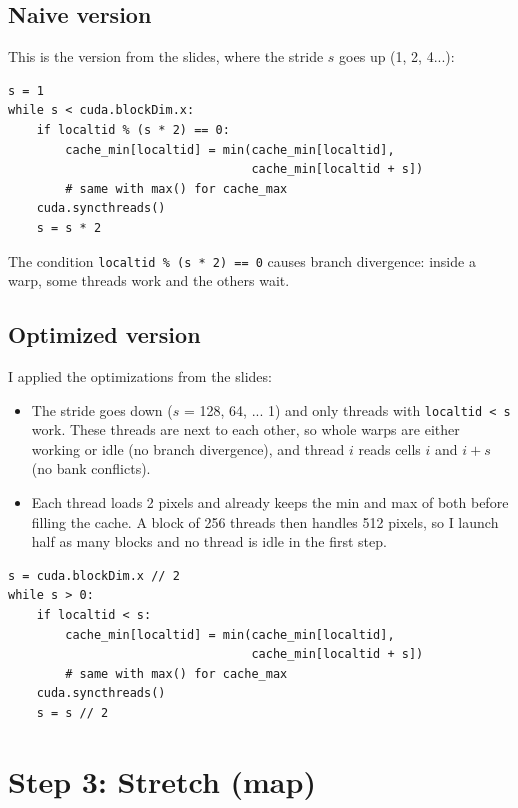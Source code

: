 \documentclass{report}
\begin{document}
\subsection*{Naive version}

This is the version from the slides, where the stride $s$ goes up (1, 2, 4...):

\begin{verbatim}
s = 1
while s < cuda.blockDim.x:
    if localtid % (s * 2) == 0:
        cache_min[localtid] = min(cache_min[localtid],
                                  cache_min[localtid + s])
        # same with max() for cache_max
    cuda.syncthreads()
    s = s * 2
\end{verbatim}

The condition \texttt{localtid \% (s * 2) == 0} causes branch divergence: inside a warp, some threads work and the others wait.

\subsection*{Optimized version}

I applied the optimizations from the slides:

\begin{itemize}
    \item The stride goes down ($s$ = 128, 64, ... 1) and only threads with \texttt{localtid < s} work. These threads are next to each other, so whole warps are either working or idle (no branch divergence), and thread $i$ reads cells $i$ and $i + s$ (no bank conflicts).
    \item Each thread loads 2 pixels and already keeps the min and max of both before filling the cache. A block of 256 threads then handles 512 pixels, so I launch half as many blocks and no thread is idle in the first step.
\end{itemize}

\begin{verbatim}
s = cuda.blockDim.x // 2
while s > 0:
    if localtid < s:
        cache_min[localtid] = min(cache_min[localtid],
                                  cache_min[localtid + s])
        # same with max() for cache_max
    cuda.syncthreads()
    s = s // 2
\end{verbatim}

\section*{Step 3: Stretch (map)}
\end{document}
